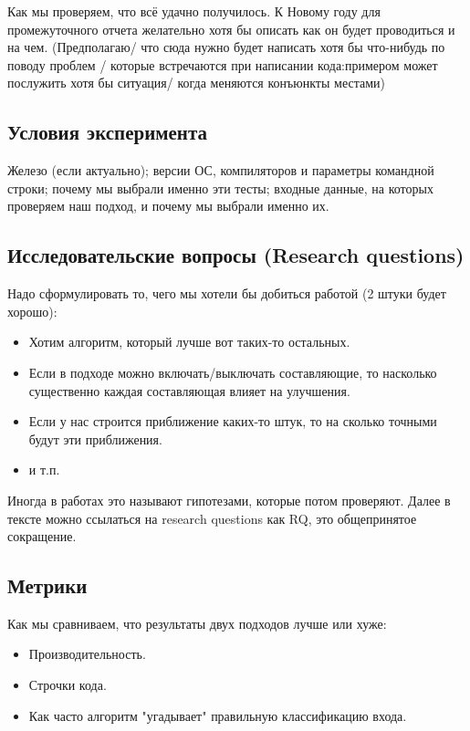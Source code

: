 
Как мы проверяем, что  всё удачно получилось.  К Новому году для промежуточного отчета желательно хотя бы описать как он будет проводиться и на чем. (Предполагаю/ что сюда нужно будет написать хотя бы что-нибудь по поводу проблем / которые встречаются при написании кода:примером может послужить хотя бы ситуация/ когда меняются конъюнкты местами)

\subsection{Условия эксперимента}
Железо (если актуально);  версии ОС, компиляторов и параметры командной строки; почему мы выбрали именно эти тесты; входные данные, на которых проверяем наш подход, и почему мы выбрали именно их.

\subsection{Исследовательские вопросы (Research questions)}
Надо сформулировать то, чего мы хотели бы добиться работой (2 штуки будет хорошо):

\begin{itemize}
\item Хотим алгоритм, который лучше вот таких-то остальных.
\item Если в подходе можно включать/выключать составляющие, то насколько существенно каждая составляющая влияет на улучшения.
\item Если у нас строится приближение каких-то штук, то на сколько точными будут эти приближения.
\item и т.п.
\end{itemize}

Иногда в работах это называют гипотезами, которые потом проверяют. Далее в тексте можно ссылаться на research questions как \textsc{RQ}, это общепринятое сокращение.

\subsection{Метрики}

Как мы сравниваем, что результаты двух подходов лучше или хуже:
\begin{itemize}
\item Производительность.
\item Строчки кода.
\item Как часто алгоритм "угадывает" правильную классификацию входа.
\end{itemize}

